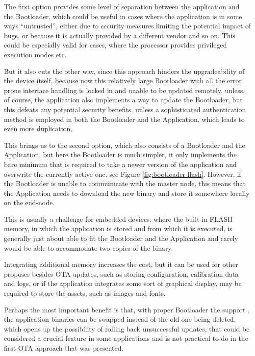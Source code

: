 The first option provides some level of separation between the application and the Bootloader, which could be useful in cases where the application is in some ways ``untrusted'', either due to security measures limiting the potential impact of bugs, or because it is actually provided by a different vendor and so on. This could be especially valid for cases, where the processor provides privileged execution modes etc.

But it also cuts the other way, since this approach hinders the upgradeability of the device itself, because now this relatively large Bootloader with all the error prone interface handling is locked in and unable to be updated remotely, unless, of course, the application also implements a way to update the Bootloader, but this defeats any potential security benefits, unless a sophisticated authentication method is employed in both the Bootloader and the Application, which leads to even more duplication.

This brings us to the second option, which also consists of a Bootloader and the Application, but here the Bootloader is much simpler, it only implements the bare minimum that is required to take a newer version of the application and overwrite the currently active one, see Figure \ref{fig:bootloader-flash}. However, if the Bootloader is unable to communicate with the master node, this means that the Application needs to download the new binary and store it somewhere locally on the end-node.

This is usually a challenge for embedded devices, where the built-in FLASH memory, in which the application is stored and from which it is executed, is generally just about able to fit the Bootloader and the Application and rarely would be able to accommodate two copies of the binary.

Integrating additional memory increases the cost, but it can be used for other proposes besides OTA updates, such as storing configuration, calibration data and logs, or if the application integrates some sort of graphical display, may be required to store the assets, such as images and fonts.

Perhaps the most important benefit is that, with proper Bootloader the support \cite{drogue_iot_firmware_2024,embassy_project_documentation_bootloader_2024}, the application binaries can be swapped instead of the old one being deleted, which opens up the possibility of rolling back unsuccessful updates, that could be considered a crucial feature in some applications and is not practical to do in the first OTA approach that was presented.

